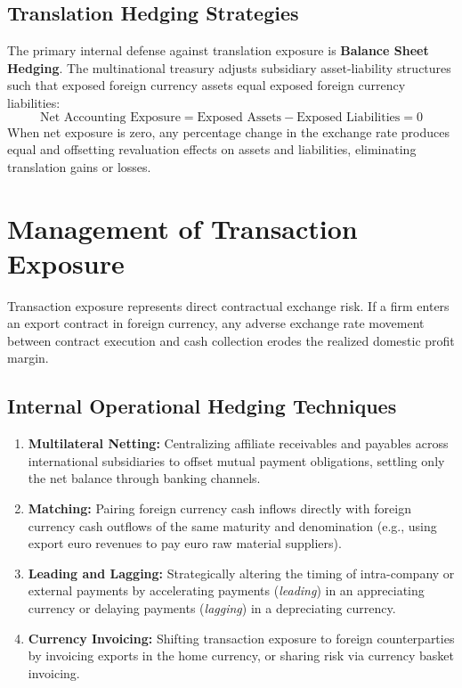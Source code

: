 \subsection{Translation Hedging Strategies}
The primary internal defense against translation exposure is \textbf{Balance Sheet Hedging}. The multinational treasury adjusts subsidiary asset-liability structures such that exposed foreign currency assets equal exposed foreign currency liabilities:
\begin{equation}
\text{Net Accounting Exposure} = \text{Exposed Assets} - \text{Exposed Liabilities} = 0
\end{equation}
When net exposure is zero, any percentage change in the exchange rate produces equal and offsetting revaluation effects on assets and liabilities, eliminating translation gains or losses.

\vspace{0.5em}

\section{Management of Transaction Exposure}
\label{sec:transaction_exposure}

Transaction exposure represents direct contractual exchange risk. If a firm enters an export contract in foreign currency, any adverse exchange rate movement between contract execution and cash collection erodes the realized domestic profit margin.

\subsection{Internal Operational Hedging Techniques}
\begin{enumerate}[leftmargin=1.5em]
    \item \textbf{Multilateral Netting:} Centralizing affiliate receivables and payables across international subsidiaries to offset mutual payment obligations, settling only the net balance through banking channels.
    \item \textbf{Matching:} Pairing foreign currency cash inflows directly with foreign currency cash outflows of the same maturity and denomination (e.g., using export euro revenues to pay euro raw material suppliers).
    \item \textbf{Leading and Lagging:} Strategically altering the timing of intra-company or external payments by accelerating payments (\textit{leading}) in an appreciating currency or delaying payments (\textit{lagging}) in a depreciating currency.
    \item \textbf{Currency Invoicing:} Shifting transaction exposure to foreign counterparties by invoicing exports in the home currency, or sharing risk via currency basket invoicing.
\end{enumerate}

